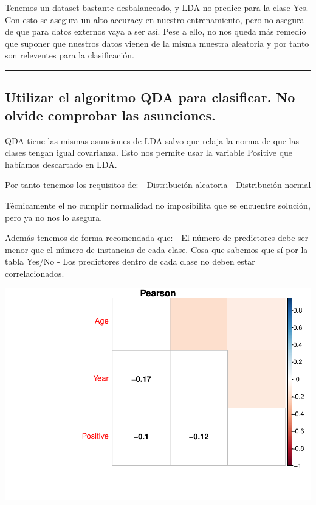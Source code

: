 \documentclass[
]{article}
\begin{document}
Tenemos un dataset bastante desbalanceado, y LDA no predice para la
clase Yes. Con esto se asegura un alto accuracy en nuestro
entrenamiento, pero no asegura de que para datos externos vaya a ser
así. Pese a ello, no nos queda más remedio que suponer que nuestros
datos vienen de la misma muestra aleatoria y por tanto son releventes
para la clasificación.

\begin{center}\rule{0.5\linewidth}{0.5pt}\end{center}

\hypertarget{utilizar-el-algoritmo-qda-para-clasificar.-no-olvide-comprobar-las-asunciones.}{%
\subsection{Utilizar el algoritmo QDA para clasificar. No olvide
comprobar las
asunciones.}\label{utilizar-el-algoritmo-qda-para-clasificar.-no-olvide-comprobar-las-asunciones.}}

QDA tiene las mismas asunciones de LDA salvo que relaja la norma de que
las clases tengan igual covarianza. Esto nos permite usar la variable
Positive que habíamos descartado en LDA.

Por tanto tenemos los requisitos de: - Distribución aleatoria -
Distribución normal

Técnicamente el no cumplir normalidad no imposibilita que se encuentre
solución, pero ya no nos lo asegura.

Además tenemos de forma recomendada que: - El número de predictores debe
ser menor que el número de instancias de cada clase. Cosa que sabemos
que sí por la tabla Yes/No - Los predictores dentro de cada clase no
deben estar correlacionados.

\begin{center}\includegraphics{Clasificacion_files/figure-latex/unnamed-chunk-27-1} \end{center}
\end{document}
